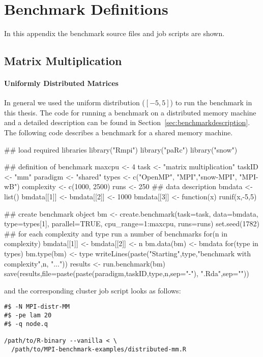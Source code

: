 \chapter{Benchmark Definitions}
\label{app:benchmark}
In this appendix the benchmark source files and job scripts are shown.

\section{Matrix Multiplication}

\subsubsection{Uniformly Distributed Matrices}

In general we used the uniform distribution ($[-5,5]$) to run the
benchmark in this thesis. The code for running a benchmark on a
distributed memory machine and a detailed description can
be found in Section~\ref{sec:benchmarkdescription}. The following code
describes a benchmark for a shared memory machine.

\begin{Scode}
## load required libraries
library("Rmpi")
library("paRc")
library("snow")

## definition of benchmark
maxcpu <- 4
task <- "matrix multiplication"
taskID <- "mm"
paradigm <- "shared"
types <- c("OpenMP", "MPI","snow-MPI", "MPI-wB")
complexity <- c(1000, 2500)
runs <- 250
## data description
bmdata <- list()
bmdata[[1]] <- bmdata[[2]] <- 1000
bmdata[[3]] <- function(x){
  runif(x,-5,5)
}

## create benchmark object
bm <- create.benchmark(task=task, data=bmdata,
                       type=types[1], parallel=TRUE,
                       cpu_range=1:maxcpu, runs=runs)
set.seed(1782)
## for each complexity and type run a number of benchmarks
for(n in complexity){
  bmdata[[1]] <- bmdata[[2]] <- n
  bm.data(bm) <- bmdata
  for(type in types){
    bm.type(bm) <- type
    writeLines(paste("Starting",type,"benchmark with complexity",n,
                     "..."))
    results <- run.benchmark(bm)
    save(results,file=paste(paste(paradigm,taskID,type,n,sep="-"),
                                  ".Rda",sep=""))
  }
}
\end{Scode}

and the corresponding cluster job script looks as follows:

\begin{verbatim}
#$ -N MPI-distr-MM
#$ -pe lam 20
#$ -q node.q

/path/to/R-binary --vanilla < \
  /path/to/MPI-benchmark-examples/distributed-mm.R
\end{verbatim}

